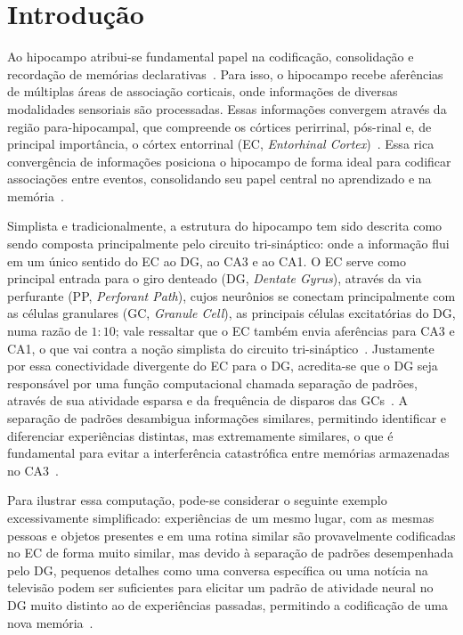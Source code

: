 \chapter{Introdução}

Ao hipocampo atribui-se fundamental papel na codificação, consolidação e recordação de memórias
declarativas~\cite{eichenbaumHippocampus1999, liaoLearning2024}. Para isso, o hipocampo recebe aferências de múltiplas áreas de
associação corticais, onde informações de diversas modalidades sensoriais são processadas. Essas informações convergem através da
região para-hipocampal, que compreende os córtices perirrinal, pós-rinal e, de principal importância, o córtex entorrinal (EC,
\textit{Entorhinal Cortex})~\cite{eichenbaumCortical2000}. Essa rica convergência de informações posiciona o hipocampo de forma
ideal para codificar associações entre eventos, consolidando seu papel central no aprendizado e na memória~\cite{henkeModel2010,
berdugo-vegaSharpening2023}.

Simplista e tradicionalmente, a estrutura do hipocampo tem sido descrita como sendo composta principalmente pelo circuito
tri-sináptico: onde a informação flui em um único sentido do EC ao DG, ao CA3 e ao CA1. O EC serve como principal entrada para o
giro denteado (DG, \textit{Dentate Gyrus}), através da via perfurante (PP, \textit{Perforant Path}), cujos neurônios se conectam
principalmente com as células granulares (GC, \textit{Granule Cell}), as principais células excitatórias do DG, numa razão de
$1:10$; vale ressaltar que o EC também envia aferências para CA3 e CA1, o que vai contra a noção simplista do circuito
tri-sináptico~\cite{basuCorticohippocampal2015}. Justamente por essa conectividade divergente do EC para o DG, acredita-se que o
DG seja responsável por uma função computacional chamada separação de padrões, através de sua atividade esparsa e da frequência de
disparos das GCs~\cite{hainmuellerDentate2020, kesnerMnemonic2006, yassaPattern2011}. A separação de padrões desambigua
informações similares, permitindo identificar e diferenciar experiências distintas, mas extremamente similares, o que é fundamental
para evitar a interferência catastrófica entre memórias armazenadas no CA3~\cite{rollsMechanisms2013}.

Para ilustrar essa computação, pode-se considerar o seguinte exemplo excessivamente simplificado: experiências de um mesmo lugar,
com as mesmas pessoas e objetos presentes e em uma rotina similar são provavelmente codificadas no EC de forma muito similar, mas
devido à separação de padrões desempenhada pelo DG, pequenos detalhes como uma conversa específica ou uma notícia na televisão
podem ser suficientes para elicitar um padrão de atividade neural no DG muito distinto ao de experiências passadas, permitindo a
codificação de uma nova memória~\cite{eichenbaumHippocampus2004}.

